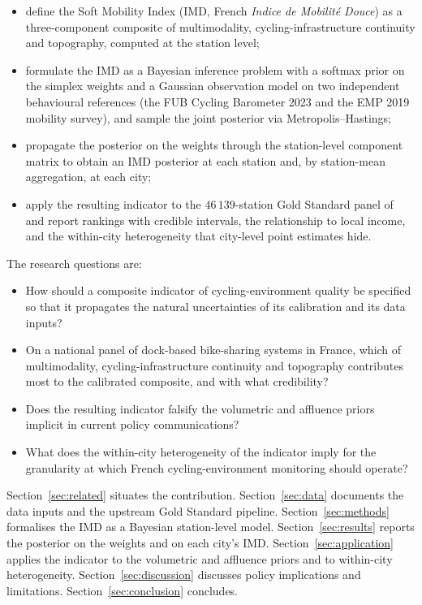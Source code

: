 \documentclass[11pt,a4paper]{article}
\begin{document}
\begin{itemize}
\item define the Soft Mobility Index (IMD, French \emph{Indice
de Mobilit\'e Douce}) as a three-component composite of
multimodality, cycling-infrastructure continuity and topography,
computed at the station level;
\item formulate the IMD as a Bayesian inference problem with a
softmax prior on the simplex weights and a Gaussian observation
model on two independent behavioural references (the FUB Cycling
Barometer 2023 and the EMP 2019 mobility survey), and sample the
joint posterior via Metropolis--Hastings;
\item propagate the posterior on the weights through the
station-level component matrix to obtain an IMD posterior at
each station and, by station-mean aggregation, at each city;
\item apply the resulting indicator to the
$46\,139$-station Gold Standard panel of \citet{Fosse2026gold}
and report rankings with credible intervals, the relationship
to local income, and the within-city heterogeneity that
city-level point estimates hide.
\end{itemize}

The research questions are:
\begin{itemize}
\item[Q1.] How should a composite indicator of cycling-environment
quality be specified so that it propagates the natural
uncertainties of its calibration and its data inputs?
\item[Q2.] On a national panel of dock-based bike-sharing systems
in France, which of multimodality, cycling-infrastructure
continuity and topography contributes most to the calibrated
composite, and with what credibility?
\item[Q3.] Does the resulting indicator falsify the volumetric
and affluence priors implicit in current policy communications?
\item[Q4.] What does the within-city heterogeneity of the
indicator imply for the granularity at which French
cycling-environment monitoring should operate?
\end{itemize}

Section~\ref{sec:related} situates the contribution.
Section~\ref{sec:data} documents the data inputs and the
upstream Gold Standard pipeline.
Section~\ref{sec:methods} formalises the IMD as a Bayesian
station-level model.
Section~\ref{sec:results} reports the posterior on the weights
and on each city's IMD.
Section~\ref{sec:application} applies the indicator to the
volumetric and affluence priors and to within-city heterogeneity.
Section~\ref{sec:discussion} discusses policy implications and
limitations.
Section~\ref{sec:conclusion} concludes.
\end{document}
